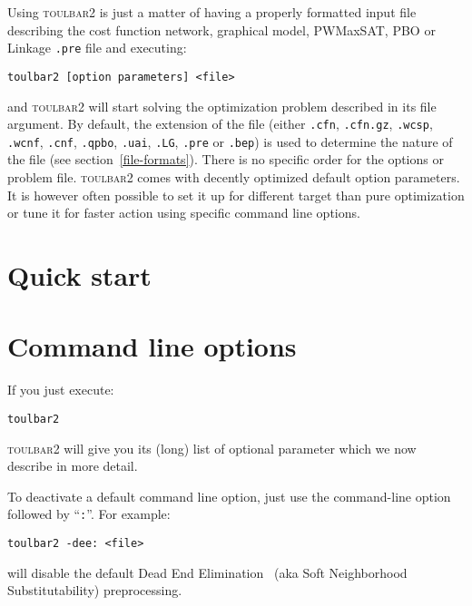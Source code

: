 \documentclass{article}
\def\toulbar2{\textsc{toulbar2}}
\begin{document}
Using \toulbar2 is just a matter of having a properly formatted input
file describing the cost function network, graphical model, PWMaxSAT,
PBO or Linkage \texttt{.pre} file and executing:

\begin{verbatim}
toulbar2 [option parameters] <file>
\end{verbatim}

and \toulbar2 will start solving the optimization problem described in
its file argument. By default, the extension of the file (either
\texttt{.cfn}, \texttt{.cfn.gz}, \texttt{.wcsp}, \texttt{.wcnf}, \texttt{.cnf}, \texttt{.qpbo},
\texttt{.uai}, \texttt{.LG}, \texttt{.pre} or \texttt{.bep}) is used
to determine the nature of the file (see
section~\ref{file-formats}). There is no specific order for the
options or problem file. \toulbar2 comes with decently optimized
default option parameters. It is however often possible to set it up
for different target than pure optimization or tune it for faster
action using specific command line options.

\section{Quick start}
\label{quickstart}



\section{Command line options}

If you just execute:

\begin{verbatim}
toulbar2
\end{verbatim}

\toulbar2 will give you its (long) list of optional parameter which we
now describe in more detail. 


To deactivate a default command line option, just use the
command-line option followed by ``\texttt{:}''. For example:

\begin{verbatim}
toulbar2 -dee: <file>
\end{verbatim}

will disable the default Dead End Elimination~\cite{Givry13a} (aka Soft Neighborhood
Substitutability) preprocessing.
\end{document}
